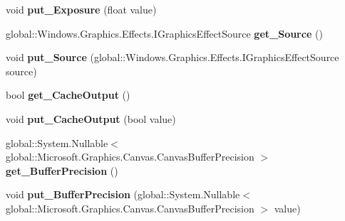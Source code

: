 \begin{DoxyCompactItemize}
void {\bfseries put\+\_\+\+Exposure} (float value)
\item 
\mbox{\label{class_microsoft_1_1_graphics_1_1_canvas_1_1_effects_1_1_exposure_effect_a3a4a21d04c4c1e3ab6ff7ab1a75397c8}} 
global\+::\+Windows.\+Graphics.\+Effects.\+I\+Graphics\+Effect\+Source {\bfseries get\+\_\+\+Source} ()
\item 
\mbox{\label{class_microsoft_1_1_graphics_1_1_canvas_1_1_effects_1_1_exposure_effect_ad8302b23b9b65d3b241aa0a15850c411}} 
void {\bfseries put\+\_\+\+Source} (global\+::\+Windows.\+Graphics.\+Effects.\+I\+Graphics\+Effect\+Source source)
\item 
\mbox{\label{class_microsoft_1_1_graphics_1_1_canvas_1_1_effects_1_1_exposure_effect_a6d781774b332d50000568372636dd32c}} 
bool {\bfseries get\+\_\+\+Cache\+Output} ()
\item 
\mbox{\label{class_microsoft_1_1_graphics_1_1_canvas_1_1_effects_1_1_exposure_effect_a173a563c6748ed7d1a15e042ffd9f8b1}} 
void {\bfseries put\+\_\+\+Cache\+Output} (bool value)
\item 
\mbox{\label{class_microsoft_1_1_graphics_1_1_canvas_1_1_effects_1_1_exposure_effect_a0268884188c61936111851732b91ddbb}} 
global\+::\+System.\+Nullable$<$ global\+::\+Microsoft.\+Graphics.\+Canvas.\+Canvas\+Buffer\+Precision $>$ {\bfseries get\+\_\+\+Buffer\+Precision} ()
\item 
\mbox{\label{class_microsoft_1_1_graphics_1_1_canvas_1_1_effects_1_1_exposure_effect_a66640d733ee7a12182cdf5db5fd6246e}} 
void {\bfseries put\+\_\+\+Buffer\+Precision} (global\+::\+System.\+Nullable$<$ global\+::\+Microsoft.\+Graphics.\+Canvas.\+Canvas\+Buffer\+Precision $>$ value)
\item 
\mbox{\label{class_microsoft_1_1_graphics_1_1_canvas_1_1_effects_1_1_exposure_effect_a83ea3eb2a6669b9a65c40a4e3ac81c16}} 

\end{DoxyCompactItemize}
